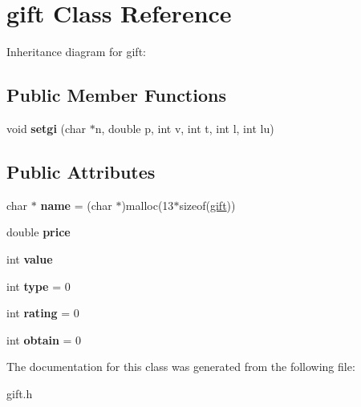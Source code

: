 \hypertarget{classgift}{}\section{gift Class Reference}
\label{classgift}


Inheritance diagram for gift\+:
\subsection*{Public Member Functions}
\begin{DoxyCompactItemize}
\item 
void {\bfseries setgi} (char $\ast$n, double p, int v, int t, int l, int lu)\hypertarget{classgift_ae17d92ff8df473d93b3e67188e2ceddd}{}\label{classgift_ae17d92ff8df473d93b3e67188e2ceddd}

\end{DoxyCompactItemize}
\subsection*{Public Attributes}
\begin{DoxyCompactItemize}
\item 
char $\ast$ {\bfseries name} = (char $\ast$)malloc(13$\ast$sizeof(\hyperlink{classgift}{gift}))\hypertarget{classgift_a252d1bb138d74f79b58e0a2adabc43ba}{}\label{classgift_a252d1bb138d74f79b58e0a2adabc43ba}

\item 
double {\bfseries price}\hypertarget{classgift_a38c9b7ebe2c0cba9604f13113ce5c7bc}{}\label{classgift_a38c9b7ebe2c0cba9604f13113ce5c7bc}

\item 
int {\bfseries value}\hypertarget{classgift_aa9e6fcf5bc68d7f151e7a853a25dcbeb}{}\label{classgift_aa9e6fcf5bc68d7f151e7a853a25dcbeb}

\item 
int {\bfseries type} = 0\hypertarget{classgift_a566df9bb482f042621ea8ecf5bcaa2b7}{}\label{classgift_a566df9bb482f042621ea8ecf5bcaa2b7}

\item 
int {\bfseries rating} = 0\hypertarget{classgift_a3462a73f3678fd479ff64afd7082a8cd}{}\label{classgift_a3462a73f3678fd479ff64afd7082a8cd}

\item 
int {\bfseries obtain} = 0\hypertarget{classgift_a02db09bd3d7e87e1177ca38279e9a1f6}{}\label{classgift_a02db09bd3d7e87e1177ca38279e9a1f6}

\end{DoxyCompactItemize}


The documentation for this class was generated from the following file\+:\begin{DoxyCompactItemize}
\item 
gift.\+h\end{DoxyCompactItemize}
